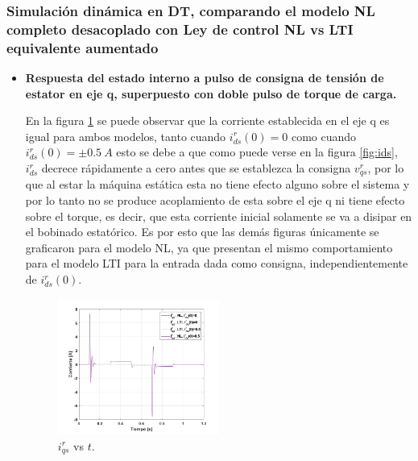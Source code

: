 \documentclass[10pt]{article}
\begin{document}
\subsubsection{Simulación dinámica en DT, comparando el modelo NL completo desacoplado con Ley de control
NL vs LTI equivalente aumentado}
\begin{itemize}

\item \textbf{Respuesta del estado interno a pulso de consigna de tensión de estator en eje q, superpuesto con doble pulso de torque de carga.}
	
	En la figura \ref{fig:iq_LTIvsNL} se puede observar que la corriente establecida en el eje q es igual para ambos modelos, tanto cuando $i^{r}_{ds}(0)=0$ como cuando $i^{r}_{ds}(0)=\pm 0.5\ A$ esto se debe a que como puede verse en la figura \ref{fig:ids}, $i^{r}_{ds}$ decrece rápidamente a cero antes que se establezca la consigna $v^{r}_{qs}$, por lo que al estar la máquina estática esta no tiene efecto alguno sobre el sistema y por lo tanto no se produce acoplamiento de esta sobre el eje q ni tiene efecto sobre el torque, es decir, que esta corriente inicial solamente se va a disipar en el bobinado estatórico.
	Es por esto que las demás figuras únicamente se graficaron para el modelo NL, ya que presentan el mismo comportamiento para el modelo LTI para la entrada dada como consigna, independientemente de $i^{r}_{ds}(0)$.\\
			\begin{figure}[h!]
	\centering
	\includegraphics[width=0.5\textwidth]{iq_LTIvsNL.png}
	\caption{\label{fig:iq_LTIvsNL} $i^{r}_{qs}$ vs $t$.}
	\end{figure}
		


\end{itemize}
\end{document}
